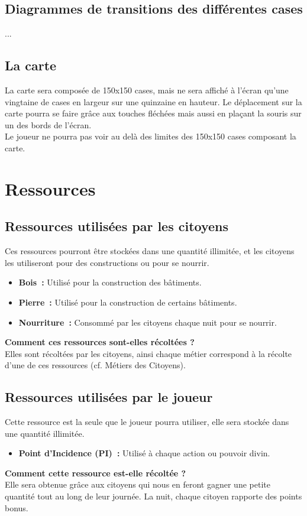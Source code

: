 \documentclass[a4paper]{article}
\begin{document}
\subsection*{Diagrammes de transitions des différentes cases}

...%

\subsection*{La carte}

La carte sera composée de 150x150 cases, mais ne sera affiché à l'écran qu'une vingtaine de cases en largeur sur une quinzaine en hauteur. Le déplacement sur la carte pourra se faire grâce aux touches fléchées mais aussi en plaçant la souris sur un des bords de l'écran.\\
Le joueur ne pourra pas voir au delà des limites des 150x150 cases composant la carte.

\section*{Ressources}

\subsection*{Ressources utilisées par les citoyens}
Ces ressources pourront être stockées dans une quantité illimitée, et les citoyens les utiliseront pour des constructions ou pour se nourrir.
\begin{itemize}
\item \textbf{Bois :} \small{ Utilisé pour la construction des bâtiments.}
\item \textbf{Pierre :} \small{ Utilisé pour la construction de certains bâtiments.}
\item \textbf{Nourriture :} \small{ Consommé par les citoyens chaque nuit pour se nourrir.}
\end{itemize}
\textbf{Comment ces ressources sont-elles récoltées ? }\\Elles sont récoltées par les citoyens, ainsi chaque métier correspond à la récolte d'une de ces ressources (cf. Métiers des Citoyens).

\subsection*{Ressources utilisées par le joueur}
Cette ressource est la seule que le joueur pourra utiliser, elle sera stockée dans une quantité illimitée.
\begin{itemize}
\item \textbf{Point d'Incidence (PI) :} \small{ Utilisé à chaque action ou pouvoir divin.}
\end{itemize}
\textbf{Comment cette ressource est-elle récoltée ? }\\Elle sera obtenue grâce aux citoyens qui nous en feront gagner une petite quantité tout au long de leur journée. La nuit, chaque citoyen rapporte des points bonus.
\end{document}
